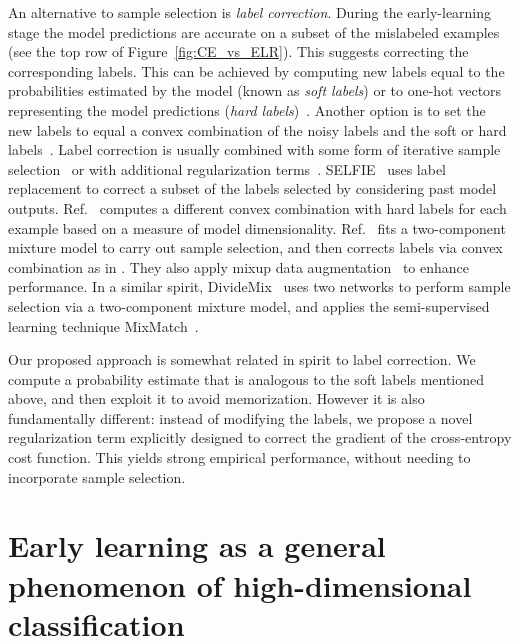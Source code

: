 \documentclass{article}
\newcommand{\1}{\mathds{1}}
\begin{document}
An alternative to sample selection is \emph{label correction}. During the early-learning stage the model predictions are accurate on a subset of the mislabeled examples (see the top row of Figure~\ref{fig:CE_vs_ELR}). This suggests correcting the corresponding labels. This can be achieved by computing new labels equal to the probabilities estimated by the model (known as \emph{soft labels}) or to one-hot vectors representing the model predictions (\emph{hard labels})~\citep{Tanaka2018JointOF,yi2019probabilistic}. Another option is to set the new labels to equal a convex combination of the noisy labels and the soft or hard labels~\citep{Reed2015TrainingDN}. Label correction is usually combined with some form of iterative sample selection~\citep{Arazo2019unsup,Ma2018DimensionalityDrivenLW,song2019selfie,li2020dividemix} or with additional regularization terms~\citep{Tanaka2018JointOF}.  SELFIE~\citep{song2019selfie} uses label replacement to correct a subset of the labels selected by considering past model outputs. Ref.~\citep{Ma2018DimensionalityDrivenLW} computes a different convex combination with hard labels for each example based on a measure of model dimensionality. Ref.~\citep{Arazo2019unsup} fits a two-component mixture model to carry out sample selection, and then corrects labels via convex combination as in \citep{Reed2015TrainingDN}. They also apply mixup data augmentation~\citep{zhang2017mixup} to enhance performance. In a similar spirit, DivideMix~\citep{li2020dividemix} uses two networks to perform sample selection via a two-component mixture model, and applies the semi-supervised learning technique MixMatch~\citep{berthelot2019mixmatch}.  

Our proposed approach is somewhat related in spirit to label correction. We compute a probability estimate that is analogous to the soft labels mentioned above, and then exploit it to avoid memorization. However it is also fundamentally different: instead of modifying the labels, we propose a novel regularization term explicitly designed to correct the gradient of the cross-entropy cost function. This yields strong empirical performance, without needing to incorporate sample selection.


\vspace{-1mm}
\section{Early learning as a general phenomenon of high-dimensional classification}
\label{sec:linear}
\end{document}
